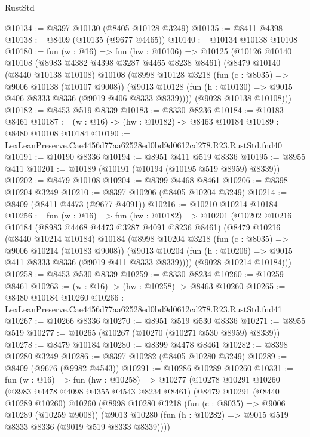 \begin{lexlean}{RustStd}
\begin{coremodule}
@10134 := @8397 @10130 (@8405 @10128 @3249)
@10135 := @8411 @4398
@10138 := @8409 (@10135 (@9677 @4465))
@10140 := @10134 @10138 @10108
@10180 := fun (w : @16) =>
  fun (hw : @10106) =>
  @10125
    (@10126
      @10140
      @10108
      (@8983 @4382 @4398 @3287 @4465 @8238 @8461)
      (@8479
        @10140
        (@8440 @10138 @10108)
        @10108
        (@8998
          @10128
          @3218
          (fun (c : @8035) => @9006 @10138 (@10107 @9008))
          (@9013 @10128 (fun (h : @10130) => @9015 @406 @8333 @8336 (@9019 @406 @8333 @8339))))
        (@9028 @10138 @10108)))
@10182 := @8453 @519 @8339
@10183 := @8330 @8236
@10184 := @10183 @8461
@10187 := (w : @16) -> (hw : @10182) -> @8463 @10184
@10189 := @8480 @10108 @10184
@10190 := LexLeanPreserve.Cae4456d77aa62528ed0bd9d0612cd278.R23.RustStd.fnd40
@10191 := @10190 @8336
@10194 := @8951 @411 @519 @8336
@10195 := @8955 @411
@10201 := @10189 (@10191 (@10194 (@10195 @519 @8959) @8339))
@10202 := @8479 @10108
@10204 := @8399 @4468 @8461
@10206 := @8398 @10204 @3249
@10210 := @8397 @10206 (@8405 @10204 @3249)
@10214 := @8409 (@8411 @4473 (@9677 @4091))
@10216 := @10210 @10214 @10184
@10256 := fun (w : @16) =>
  fun (hw : @10182) =>
  @10201
    (@10202
      @10216
      @10184
      (@8983 @4468 @4473 @3287 @4091 @8236 @8461)
      (@8479
        @10216
        (@8440 @10214 @10184)
        @10184
        (@8998
          @10204
          @3218
          (fun (c : @8035) => @9006 @10214 (@10183 @9008))
          (@9013 @10204 (fun (h : @10206) => @9015 @411 @8333 @8336 (@9019 @411 @8333 @8339))))
        (@9028 @10214 @10184)))
@10258 := @8453 @530 @8339
@10259 := @8330 @8234
@10260 := @10259 @8461
@10263 := (w : @16) -> (hw : @10258) -> @8463 @10260
@10265 := @8480 @10184 @10260
@10266 := LexLeanPreserve.Cae4456d77aa62528ed0bd9d0612cd278.R23.RustStd.fnd41
@10267 := @10266 @8336
@10270 := @8951 @519 @530 @8336
@10271 := @8955 @519
@10277 := @10265 (@10267 (@10270 (@10271 @530 @8959) @8339))
@10278 := @8479 @10184
@10280 := @8399 @4478 @8461
@10282 := @8398 @10280 @3249
@10286 := @8397 @10282 (@8405 @10280 @3249)
@10289 := @8409 (@9676 (@9982 @4543))
@10291 := @10286 @10289 @10260
@10331 := fun (w : @16) =>
  fun (hw : @10258) =>
  @10277
    (@10278
      @10291
      @10260
      (@8983 @4478 @4098 @4355 @4543 @8234 @8461)
      (@8479
        @10291
        (@8440 @10289 @10260)
        @10260
        (@8998
          @10280
          @3218
          (fun (c : @8035) => @9006 @10289 (@10259 @9008))
          (@9013 @10280 (fun (h : @10282) => @9015 @519 @8333 @8336 (@9019 @519 @8333 @8339))))

\end{coremodule}
\end{lexlean}
